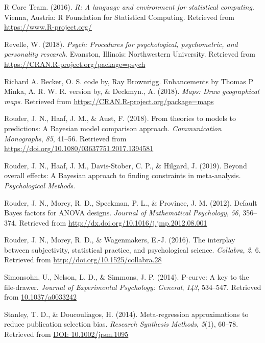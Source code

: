\documentclass[english,,man]{apa6}
\begin{document}
\leavevmode\hypertarget{ref-R-base}{}%
R Core Team. (2016). \emph{R: A language and environment for statistical computing}. Vienna, Austria: R Foundation for Statistical Computing. Retrieved from \url{https://www.R-project.org/}

\leavevmode\hypertarget{ref-R-psych}{}%
Revelle, W. (2018). \emph{Psych: Procedures for psychological, psychometric, and personality research}. Evanston, Illinois: Northwestern University. Retrieved from \url{https://CRAN.R-project.org/package=psych}

\leavevmode\hypertarget{ref-R-maps}{}%
Richard A. Becker, O. S. code by, Ray Brownrigg. Enhancements by Thomas P Minka, A. R. W. R. version by, \& Deckmyn., A. (2018). \emph{Maps: Draw geographical maps}. Retrieved from \url{https://CRAN.R-project.org/package=maps}

\leavevmode\hypertarget{ref-Rouder:etal:2018}{}%
Rouder, J. N., Haaf, J. M., \& Aust, F. (2018). From theories to models to predictions: A Bayesian model comparison approach. \emph{Communication Monographs}, \emph{85}, 41--56. Retrieved from \url{https://doi.org/10.1080/03637751.2017.1394581}

\leavevmode\hypertarget{ref-Rouder:etal:2019b}{}%
Rouder, J. N., Haaf, J. M., Davis-Stober, C. P., \& Hilgard, J. (2019). Beyond overall effects: A Bayesian approach to finding constraints in meta-analysis. \emph{Psychological Methods}.

\leavevmode\hypertarget{ref-Rouder:etal:2012}{}%
Rouder, J. N., Morey, R. D., Speckman, P. L., \& Province, J. M. (2012). Default Bayes factors for ANOVA designs. \emph{Journal of Mathematical Psychology}, \emph{56}, 356--374. Retrieved from \url{http://dx.doi.org/10.1016/j.jmp.2012.08.001}

\leavevmode\hypertarget{ref-Rouder:etal:2016b}{}%
Rouder, J. N., Morey, R. D., \& Wagenmakers, E.-J. (2016). The interplay between subjectivity, statistical practice, and psychological science. \emph{Collabra}, \emph{2}, 6. Retrieved from \url{http://doi.org/10.1525/collabra.28}

\leavevmode\hypertarget{ref-Simonsohn:etal:2014}{}%
Simonsohn, U., Nelson, L. D., \& Simmons, J. P. (2014). P-curve: A key to the file-drawer. \emph{Journal of Experimental Psychology: General}, \emph{143}, 534--547. Retrieved from \url{10.1037/a0033242}

\leavevmode\hypertarget{ref-Stanley:Doucouliagos:2014}{}%
Stanley, T. D., \& Doucouliagos, H. (2014). Meta-regression approximations to reduce publication selection bias. \emph{Research Synthesis Methods}, \emph{5}(1), 60--78. Retrieved from \href{DOI:\%2010.1002/jrsm.1095}{DOI: 10.1002/jrsm.1095}
\end{document}
